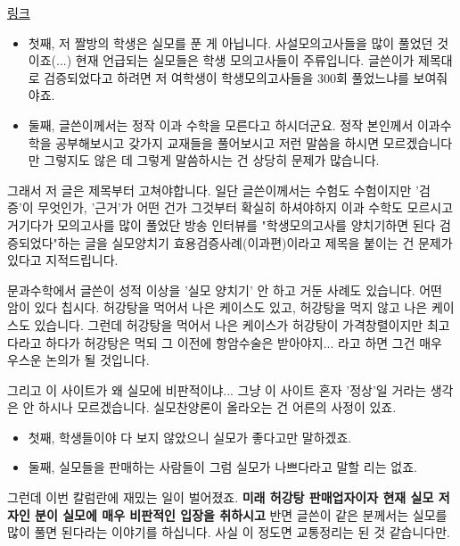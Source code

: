 \vspace{5mm}

\href{http://kockoc.com/column/556875}{링크}
\vspace{5mm}

\begin{itemize}
    \item 첫째, 저 짤방의 학생은 실모를 푼 게 아닙니다. 사설모의고사들을 많이 풀었던 것이죠(...)
    현재 언급되는 실모들은 학생 모의고사들이 주류입니다.
    글쓴이가 제목대로 검증되었다고 하려면 저 여학생이 학생모의고사들을 300회 풀었느냐를 보여줘야죠.
    \item 둘째, 글쓴이께서는 정작 이과 수학을 모른다고 하시더군요.
    정작 본인께서 이과수학을 공부해보시고 갖가지 교재들을 풀어보시고 저런 말씀을 하시면 모르겠습니다만
    그렇지도 않은 데 그렇게 말씀하시는 건 상당히 문제가 많습니다.
\end{itemize}
\vspace{5mm}

그래서 저 글은 제목부터 고쳐야합니다.
일단 글쓴이께서는 수험도 수험이지만 '검증'이 무엇인가, '근거'가 어떤 건가 그것부터 확실히 하셔야하지
이과 수학도 모르시고 거기다가 모의고사를 많이 풀었단 방송 인터뷰를 "학생모의고사를 양치기하면 된다 검증되었다"하는 글을
실모양치기 효용검증사례(이과편)이라고 제목을 붙이는 건 문제가 있다고 지적드립니다.
\vspace{5mm}

문과수학에서 글쓴이 성적 이상을  '실모 양치기' 안 하고 거둔 사례도 있습니다.
어떤 암이 있다 칩시다. 허강탕을 먹어서 나은 케이스도 있고, 허강탕을 먹지 않고 나은 케이스도 있습니다.
그런데 허강탕을 먹어서 나은 케이스가 허강탕이 가격창렬이지만 최고다라고 하다가
허강탕은 먹되 그 이전에 항암수술은 받아야지... 라고 하면 그건 매우 우스운 논의가 될 것입니다.
\vspace{5mm}

그리고 이 사이트가 왜 실모에 비판적이냐... 그냥 이 사이트 혼자 '정상'일 거라는 생각은 안 하시나 모르겠습니다.
실모찬양론이 올라오는 건 어른의 사정이 있죠.
\begin{itemize}
    \item 첫째, 학생들이야 다 보지 않았으니 실모가 좋다고만 말하겠죠.
    \item 둘째, 실모들을 판매하는 사람들이 그럼 실모가 나쁘다라고 말할 리는 없죠.
\end{itemize}
그런데 이번 칼럼란에 재밌는 일이 벌어졌죠.
\textbf{미래 허강탕 판매업자이자 현재 실모 저자인 분이 실모에 매우 비판적인 입장을 취하시고}
반면 글쓴이 같은 분께서는 실모를 많이 풀면 된다라는 이야기를 하십니다.
사실 이 정도면 교통정리는 된 것 같습니다만.
\vspace{5mm}

